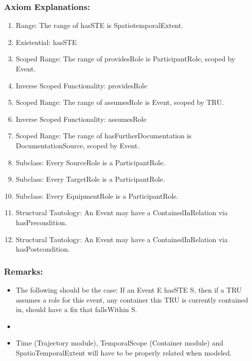 \subsubsection*{Axiom Explanations:}
\begin{enumerate}
    \item Range: The range of \textsf{hasSTE} is \textsf{SpatiotemporalExtent}.
    \item Existential: \textsf{hasSTE}
    \item Scoped Range: The range of \textsf{providesRole} is \textsf{ParticipantRole}, scoped by \textsf{Event}.
    \item Inverse Scoped Functionality: \textsf{providesRole}
    \item Scoped Range: The range of \textsf{assumesRole} is \textsf{Event}, scoped by \textsf{TRU}.
    \item Inverse Scoped Functionality: \textsf{assumesRole}
    \item Scoped Range: The range of \textsf{hasFurtherDocumentation} is \textsf{DocumentationSource}, scoped by \textsf{Event}.
    \item Subclass: Every \textsf{SourceRole} is a \textsf{ParticipantRole}.
    \item Subclass: Every \textsf{TargetRole} is a \textsf{ParticipantRole}.
    \item Subclass: Every \textsf{EquipmentRole} is a \textsf{ParticipantRole}.
    \item Structural Tautology: An \textsf{Event} may have a \textsf{ContainedInRelation} via \textsf{hasPrecondition}.
    \item Structural Tautology: An \textsf{Event} may have a \textsf{ContainedInRelation} via \textsf{hasPostcondition}.
\end{enumerate}

\subsubsection{Remarks:}
\begin{itemize}
    \item The following should be the case: If an Event E hasSTE S, then if a TRU assumes a role for this event, any container this TRU is currently contained in, should have a fix that fallsWithin S.
    \item \item Time (Trajectory module), TemporalScope (Container module) and SpatioTemporalExtent will have to be properly related when modeled.
\end{itemize}

